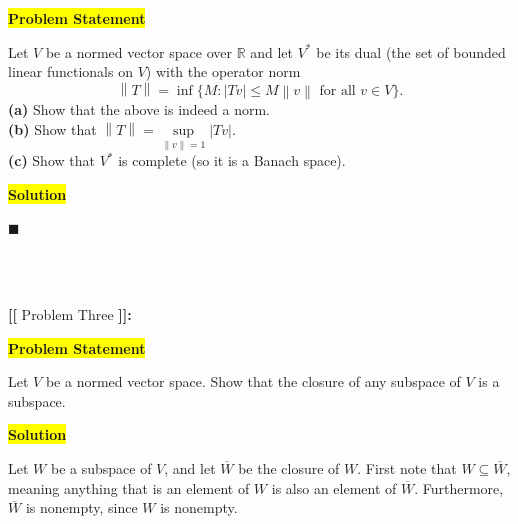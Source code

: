 \documentclass[12pt]{article}
\newcommand\norm[1]{\left\lVert#1\right\rVert}
\newcommand{\mybox}{%
    \collectbox{%
        \setlength{\fboxsep}{2pt}%
        \fbox{\BOXCONTENT}%
    }%
}
\begin{document}
\vspace{3mm}

\noindent\mybox{\colorbox{yellow}{\textbf{Problem Statement}}}\hspace{3mm}\hrulefill 

\noindent Let $V$ be a normed vector space over $\mathbb{R}$ and let $V^*$ be its dual (the set of bounded linear functionals on $V$) with the operator norm $$\norm{T} = \inf \lbrace M : |Tv| \leq M\norm{v} \text{ for all } v \in V \rbrace.$$
\textbf{(a)} Show that the above is indeed a norm.\\
\textbf{(b)} Show that $\norm{T} = \sup\limits_{\norm{v}=1} |Tv|.$ \\
\textbf{(c)} Show that $V^*$ is complete (so it is a Banach space).

\vspace{5mm}

\noindent\mybox{\colorbox{yellow}{\textbf{Solution}}}\hspace{3mm}\hrulefill

\noindent 

\hfill$\blacksquare$

\vfill

\begin{center}
\\
\vspace{2mm}
\vspace{-0.65cm}
\hrulefill \\
\vspace{-0.95cm}
\hrulefill
\end{center}

\pagebreak

\noindent \textbf{{\huge [}{\Large [}} Problem Three \textbf{{\Large ]}{\huge ]}}{\Large \textbf{:}}

\vspace{3mm}

\noindent\mybox{\colorbox{yellow}{\textbf{Problem Statement}}}\hspace{3mm}\hrulefill 

\noindent Let $V$ be a normed vector space. Show that the closure of any subspace of $V$ is a subspace.

\vspace{5mm}

\noindent\mybox{\colorbox{yellow}{\textbf{Solution}}}\hspace{3mm}\hrulefill

\noindent Let $W$ be a subspace of $V$, and let $\overline{W}$ be the closure of $W$. First note that $W\subseteq\overline{W}$, meaning anything that is an element of $W$ is also an element of $\overline{W}$. Furthermore, $\overline{W}$ is nonempty, since $W$ is nonempty. 
\end{document}
